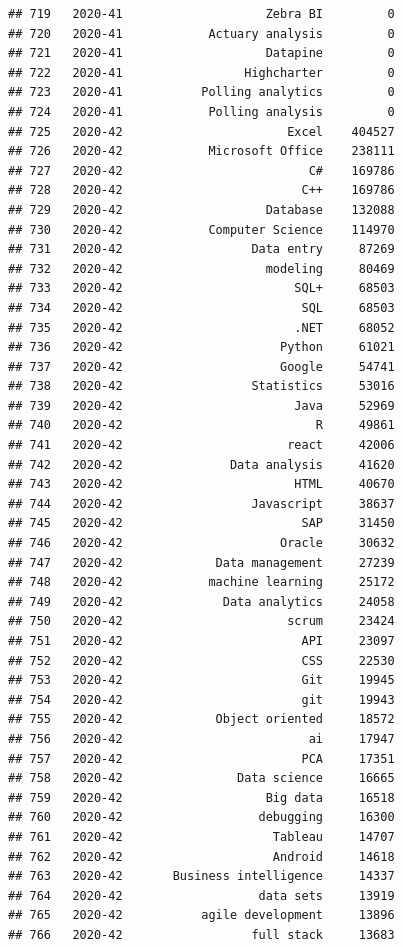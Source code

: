 \documentclass[
]{article}
\begin{document}
\begin{verbatim}
## 719   2020-41                    Zebra BI         0
## 720   2020-41            Actuary analysis         0
## 721   2020-41                    Datapine         0
## 722   2020-41                 Highcharter         0
## 723   2020-41           Polling analytics         0
## 724   2020-41            Polling analysis         0
## 725   2020-42                       Excel    404527
## 726   2020-42            Microsoft Office    238111
## 727   2020-42                          C#    169786
## 728   2020-42                         C++    169786
## 729   2020-42                    Database    132088
## 730   2020-42            Computer Science    114970
## 731   2020-42                  Data entry     87269
## 732   2020-42                    modeling     80469
## 733   2020-42                        SQL+     68503
## 734   2020-42                         SQL     68503
## 735   2020-42                        .NET     68052
## 736   2020-42                      Python     61021
## 737   2020-42                      Google     54741
## 738   2020-42                  Statistics     53016
## 739   2020-42                        Java     52969
## 740   2020-42                           R     49861
## 741   2020-42                       react     42006
## 742   2020-42               Data analysis     41620
## 743   2020-42                        HTML     40670
## 744   2020-42                  Javascript     38637
## 745   2020-42                         SAP     31450
## 746   2020-42                      Oracle     30632
## 747   2020-42             Data management     27239
## 748   2020-42            machine learning     25172
## 749   2020-42              Data analytics     24058
## 750   2020-42                       scrum     23424
## 751   2020-42                         API     23097
## 752   2020-42                         CSS     22530
## 753   2020-42                         Git     19945
## 754   2020-42                         git     19943
## 755   2020-42             Object oriented     18572
## 756   2020-42                          ai     17947
## 757   2020-42                         PCA     17351
## 758   2020-42                Data science     16665
## 759   2020-42                    Big data     16518
## 760   2020-42                   debugging     16300
## 761   2020-42                     Tableau     14707
## 762   2020-42                     Android     14618
## 763   2020-42       Business intelligence     14337
## 764   2020-42                   data sets     13919
## 765   2020-42           agile development     13896
## 766   2020-42                  full stack     13683

\end{verbatim}
\end{document}
